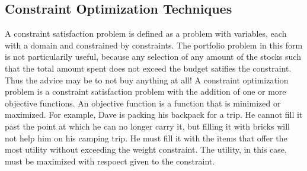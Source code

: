 \documentclass{article}
\begin{document}
    \subsection{Constraint Optimization Techniques}
    A constraint satisfaction problem is defined as a problem with variables, each with a domain and constrained by constraints. The portfolio
    problem in this form is not particularily useful, because any selection of any amount of the stocks such that the total amount spent does 
    not exceed the budget satifies the constraint. Thus the advice may be to not buy anything at all! A constraint optimization problem is a 
    constraint satisfaction problem with the addition of one or more objective functions. An objective function is a function that is minimized
    or maximized. For example, Dave is packing his backpack for a trip. He cannot fill it past the point at which he can no longer 
    carry it, but filling it with bricks will not help him on his camping trip. He must fill it with the items that offer the most utility
    without exceeding the weight constraint. The utility, in this case, must be maximized with respoect given to the constraint. 
\end{document}
